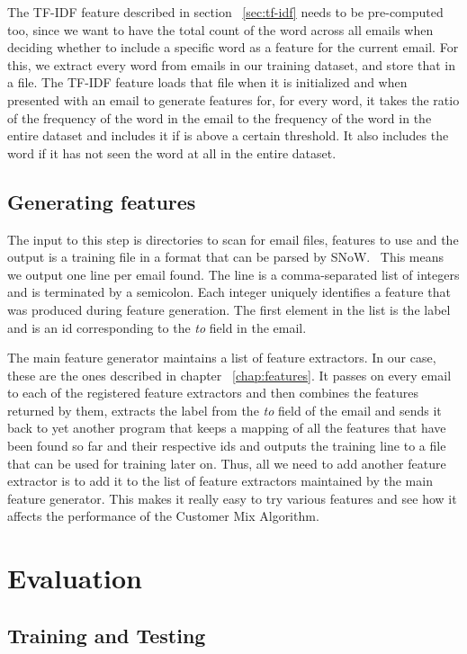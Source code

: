\documentclass[senior,oneside]{UIUC}
\begin{document}
The TF-IDF feature described in section ~\ref{sec:tf-idf} needs to be pre-computed too, since we want to have the total count of the word across all emails when deciding whether to include a specific word as a feature for the current email. For this, we extract every word from emails in our training dataset, and store that in a file. The TF-IDF feature loads that file when it is initialized and when presented with an email to generate features for, for every word, it takes the ratio of the frequency of the word in the email to the frequency of the word in the entire dataset and includes it if is above a certain threshold. It also includes the word if it has not seen the word at all in the entire dataset.

\section{Generating features}

The input to this step is directories to scan for email files, features to use and the output is a training file in a format that can be parsed by SNoW. \
This means we output one line per email found. The line is a comma-separated list of integers and is terminated by a semicolon. Each integer uniquely identifies a feature that was produced during feature generation. The first element in the list is the label and is an id corresponding to the \emph{to} field in the email. 

The main feature generator maintains a list of feature extractors. In our case, these are the ones described in chapter ~\ref{chap:features}. It passes on every email to each of the registered feature extractors and then combines the features returned by them, extracts the label from the \emph{to} field of the email and sends it back to yet another program that keeps a mapping of all the features that have been found so far and their respective ids and outputs the training line to a file that can be used for training later on. Thus, all we need to add another feature extractor is to add it to the list of feature extractors maintained by the main feature generator. This makes it really easy to try various features and see how it affects the performance of the Customer Mix Algorithm.

\chapter{Evaluation}
\section{Training and Testing}
\end{document}
